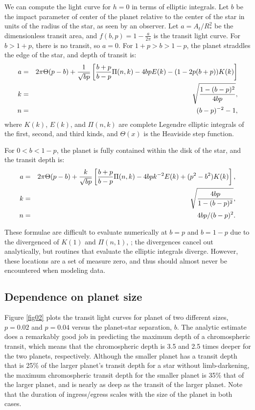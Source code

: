 \documentclass[manuscript]{aastex}
\begin{document}
We can compute the light curve for $h=0$ in terms of elliptic integrals.
Let $b$ be the impact parameter of center of the planet relative to
the center of the star in units of the radius of the star, as
seen by an observer.  Let $a = A_t/R_*^2$ be the dimensionless transit
area, and $f(b,p)=1-\frac{a}{2\pi}$ is the transit light curve.
For $b > 1+p$, there is no transit, so $a=0$.
For $1+p > b > 1-p$, the planet straddles the edge of the star, and
depth of transit is:
\begin{eqnarray}\label{ingress}
a&=&2\pi\Theta(p-b)+{1\over \sqrt{bp}}\left[{b+p\over b-p}\Pi(n,k)-4bpE(k)-(1-2p(b+p))K(k)\right] \cr
k&=&\sqrt{1-(b-p)^2\over 4bp}, \cr 
n&=&(b-p)^{-2}-1,
\end{eqnarray}
where $K(k)$, $E(k)$, and $\Pi(n,k)$ are complete Legendre elliptic 
integrals of the first, second, and third kinds, and $\Theta(x)$ is
the Heaviside step function.

For $0 < b < 1-p$, the planet is fully contained within the disk of the star,
and the transit depth is:
\begin{eqnarray}\label{disk}
a&=&2\pi\Theta(p-b)+{k\over \sqrt{bp}}\left[{b+p\over b-p}\Pi(n,k)-4bpk^{-2}E(k)
             +(p^2-b^2)K(k)\right],\cr
k&=&\sqrt{4bp\over 1-(b-p)^2},\cr
n&=&4bp/(b-p)^2.
\end{eqnarray}

These formulae are difficult to evaluate numerically at 
$b=p$ and $b=1-p$ due to the divergenced of $K(1)$ and $\Pi(n,1)$,
; the divergences cancel out analytically, but routines that
evaluate the elliptic integrals diverge.  However, these locations
are a set of measure zero, and thus should almost never be encountered
when modeling data.

\subsection{Dependence on planet size}

Figure \ref{fig02} plots the transit light curves for planet of
two different sizes, $p=0.02$ and $p=0.04$ versus the planet-star
separation, $b$.  The analytic estimate does a remarkably good
job in predicting the maximum depth of a chromospheric transit,
which means that the chromospheric depth is 3.5 and 2.5 times
deeper for the two planets, respectively.  Although the smaller
planet has a transit depth that is 25\% of the larger planet's
transit depth for a star without limb-darkening, the maximum 
chromospheric transit depth for the smaller planet is 35\% that 
of the larger planet, and is nearly as deep as the transit of 
the larger planet.  Note that the duration of ingress/egress 
scales with the size of the planet in both cases.  
\end{document}
